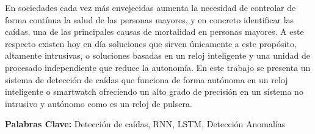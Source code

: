 \documentclass[../tfm.tex]{subfiles}
\begin{document}
En sociedades cada vez más envejecidas aumenta la necesidad de controlar de forma contínua la salud de las personas mayores, y en concreto identificar las caídas, una de las principales causas de mortalidad en personas mayores. A este respecto existen hoy en día soluciones que sirven únicamente a este propósito, altamente intrusivas, o soluciones basadas en un reloj inteligente y una unidad de procesado independiente que reduce la autonomía. En este trabajo se presenta un sistema de detección de caídas que funciona de forma autónoma en un reloj inteligente o smartwatch ofreciendo un alto grado de precisión en un sistema no intrusivo y autónomo como es un reloj de pulsera.

{\bf Palabras Clave:} Detección de caídas, RNN, LSTM, Detección Anomalías 
\end{document}
